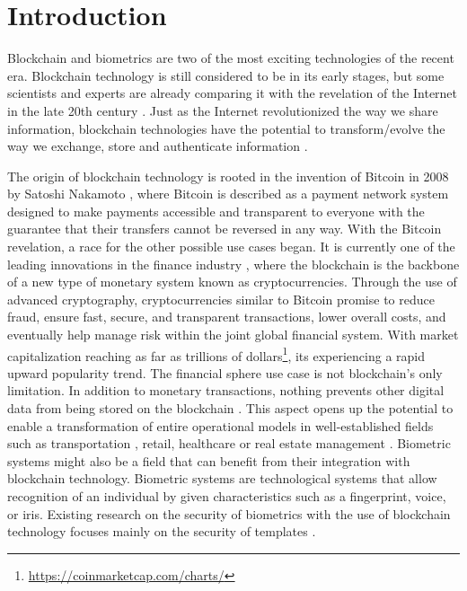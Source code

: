 


\chapter{Introduction}

Blockchain and biometrics are two of the most exciting technologies of the recent era. Blockchain technology is still considered to be in its early stages, but some scientists and experts are already comparing it with the revelation of the Internet in the late 20th century \cite{DecentralizedNetworksFutureInternet}. Just as the Internet revolutionized the way we share information, blockchain technologies have the potential to transform/evolve the way we exchange, store and authenticate information \cite{DecentralizedNetworksFutureInternet}.

The origin of blockchain technology is rooted in the invention of Bitcoin in 2008 by Satoshi Nakamoto \cite{nakamoto2012bitcoin}, where Bitcoin is described as a payment network system designed to make payments accessible and transparent to everyone with the guarantee that their transfers cannot be reversed in any way. With the Bitcoin revelation, a race for the other possible use cases began. It is currently one of the leading innovations in the finance industry \cite{blockchainInFinance}, where the blockchain is the backbone of a new type of monetary system known as cryptocurrencies. Through the use of advanced cryptography, cryptocurrencies similar to Bitcoin promise to reduce fraud, ensure fast, secure, and transparent transactions, lower overall costs, and eventually help manage risk within the joint global financial system. With market capitalization reaching as far as trillions of dollars\footnote{\url{https://coinmarketcap.com/charts/}}, its experiencing a rapid upward popularity trend. The financial sphere use case is not blockchain's only limitation. In addition to monetary transactions, nothing prevents other digital data from being stored on the blockchain \cite{BlockchainAndBiometrics}. This aspect opens up the potential to enable a transformation of entire operational models in well-established fields such as transportation \cite{blockchainInTransportation}, retail\cite{blockchainInRetail}, healthcare\cite{blockchainInHealthcare} or real estate management \cite{blockchainInRealEstate}. 
Biometric systems might also be a field that can benefit from their integration with blockchain technology. Biometric systems are technological systems that allow recognition of an individual by given characteristics such as a fingerprint, voice, or iris.  Existing research on the security of biometrics with the use of blockchain technology focuses mainly on the security of templates \cite{SecuringBiometricAuthenticationBlockchain, BlockchainAndBiometrics, BiometricsOnBlockchain}. 


